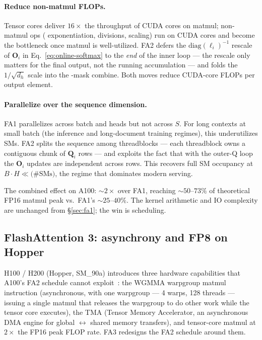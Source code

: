 \paragraph{Reduce non-matmul FLOPs.} Tensor cores deliver $16\times$
the throughput of CUDA cores on matmul; non-matmul ops (
exponentiation, divisions, scaling) run on CUDA cores and become the
bottleneck once matmul is well-utilized. FA2 defers the
$\mathrm{diag}(\ell_i)^{-1}$ rescale of $\boldsymbol{O}_i$ in
Eq.~\eqref{eq:online-softmax} to the \emph{end} of the inner loop ---
the rescale only matters for the final output, not the running
accumulation --- and folds the $1/\sqrt{d_h}$ scale into the
-mask combine. Both moves reduce CUDA-core FLOPs per output
element.

\paragraph{Parallelize over the sequence dimension.} FA1 parallelizes
across batch and heads but not across $S$. For long contexts at small
batch (the inference and long-document training regimes), this
underutilizes SMs. FA2 splits the sequence among threadblocks --- each
threadblock owns a contiguous chunk of $\boldsymbol{Q}_i$ rows --- and
exploits the fact that with the outer-Q loop the $\boldsymbol{O}_i$
updates are independent across  rows. This recovers full SM
occupancy at $B \cdot H \ll \text{(\#SMs)}$, the regime that dominates
modern serving.

The combined effect on A100: $\sim\!2\times$ over FA1, reaching $\sim
50\text{--}73\%$ of theoretical FP16 matmul peak vs.\ FA1's $\sim
25\text{--}40\%$. The kernel arithmetic and IO complexity are
unchanged from \S\ref{sec:fa1}; the win is scheduling.

\subsection{FlashAttention 3: asynchrony and FP8 on Hopper}
\label{sec:fa3}

H100 / H200 (Hopper, SM\_90a) introduces three hardware capabilities
that A100's FA2 schedule cannot exploit~\citep{shah2024}: the WGMMA
warpgroup matmul instruction (asynchronous, with one warpgroup --- 4
warps, 128 threads --- issuing a single matmul that releases the
warpgroup to do other work while the tensor core executes), the TMA
(Tensor Memory Accelerator, an asynchronous DMA engine for global
$\leftrightarrow$ shared memory transfers), and  tensor-core matmul
at $2\times$ the FP16 peak FLOP rate. FA3 redesigns
the FA2 schedule around them.

